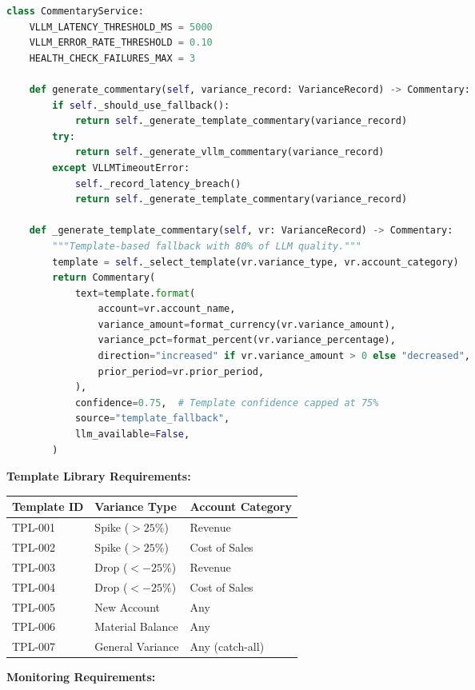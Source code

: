 \begin{lstlisting}[language=Python,caption={vLLM Fallback Logic}]
class CommentaryService:
    VLLM_LATENCY_THRESHOLD_MS = 5000
    VLLM_ERROR_RATE_THRESHOLD = 0.10
    HEALTH_CHECK_FAILURES_MAX = 3
    
    def generate_commentary(self, variance_record: VarianceRecord) -> Commentary:
        if self._should_use_fallback():
            return self._generate_template_commentary(variance_record)
        try:
            return self._generate_vllm_commentary(variance_record)
        except VLLMTimeoutError:
            self._record_latency_breach()
            return self._generate_template_commentary(variance_record)
    
    def _generate_template_commentary(self, vr: VarianceRecord) -> Commentary:
        """Template-based fallback with 80% of LLM quality."""
        template = self._select_template(vr.variance_type, vr.account_category)
        return Commentary(
            text=template.format(
                account=vr.account_name,
                variance_amount=format_currency(vr.variance_amount),
                variance_pct=format_percent(vr.variance_percentage),
                direction="increased" if vr.variance_amount > 0 else "decreased",
                prior_period=vr.prior_period,
            ),
            confidence=0.75,  # Template confidence capped at 75%
            source="template_fallback",
            llm_available=False,
        )
\end{lstlisting}

\textbf{Template Library Requirements:}

\begin{tabular}{lll}
\toprule
\textbf{Template ID} & \textbf{Variance Type} & \textbf{Account Category} \\
\midrule
TPL-001 & Spike ($>25\%$) & Revenue \\
TPL-002 & Spike ($>25\%$) & Cost of Sales \\
TPL-003 & Drop ($<-25\%$) & Revenue \\
TPL-004 & Drop ($<-25\%$) & Cost of Sales \\
TPL-005 & New Account & Any \\
TPL-006 & Material Balance & Any \\
TPL-007 & General Variance & Any (catch-all) \\
\bottomrule
\end{tabular}

\textbf{Monitoring Requirements:}

